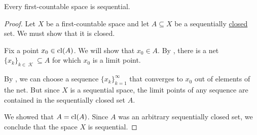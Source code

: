 \begin{proposition}\label{thm:first_countable_spaces_are_sequential}
  Every first-countable space is sequential.
\end{proposition}
\begin{proof}
  Let \( X \) be a first-countable space and let \( A \subseteq X \) be a sequentially \hyperref[def:sequential_topological_closure_operator]{closed} set. We must show that it is closed.

  Fix a point \( x_0 \in \operatorname{cl}(A) \). We will show that \( x_0 \in A \). By , there is a net \( \{ x_k \}_{k \in \mscrK} \subseteq A \) for which \( x_0 \) is a limit point.

  By , we can choose a sequence \( \{ x_k \}_{k=1}^\infty \) that converges to \( x_0 \) out of elements of the net. But since \( X \) is a sequential space, the limit points of any sequence are contained in the sequentially closed set \( A \).

  We showed that \( A = \operatorname{cl}(A) \). Since \( A \) was an arbitrary sequentially closed set, we conclude that the space \( X \) is sequential.
\end{proof}
